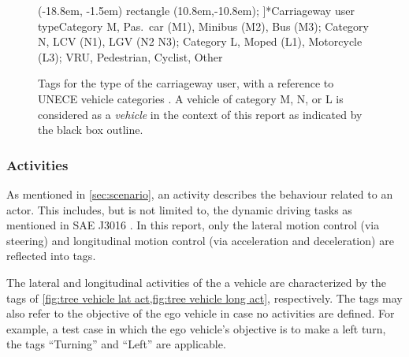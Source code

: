\begin{figure}
	\centering
	\tree[%
	\draw[draw=black, line width=0.5mm] (-18.8em, -1.5em) rectangle (10.8em,-10.8em);%
	]{*Carriageway user type}{Category M, Pas.\ car (M1), Minibus (M2), Bus (M3); Category N, LCV (N1), LGV (N2 N3); Category L, Moped (L1), Motorcycle (L3); VRU, Pedestrian, Cyclist, Other}
	\caption{Tags for the type of the carriageway user, with a reference to UNECE vehicle categories \cite{vehicle_categories2011}. %
		A vehicle of category M, N, or L is considered as a \emph{vehicle} in the context of this report as indicated by the black box outline. 
	}
	\label{fig:tree carriageway user type}
\end{figure}

\subsubsection{Activities}
As mentioned in \cref{sec:scenario}, an activity describes the behaviour related to an actor. This includes, but is not limited to, the dynamic driving tasks as mentioned in SAE J3016 \cite{sea2018j3016}. In this report, only the lateral motion control (via steering) and longitudinal motion control (via acceleration and deceleration) are reflected into tags.

The lateral and longitudinal activities of the a vehicle are characterized by the tags of \cref{fig:tree vehicle lat act,fig:tree vehicle long act}, respectively. The tags may also refer to the objective of the ego vehicle in case no activities are defined. For example, a test case in which the ego vehicle's objective is to make a left turn, the tags ``Turning'' and ``Left'' are applicable. 

